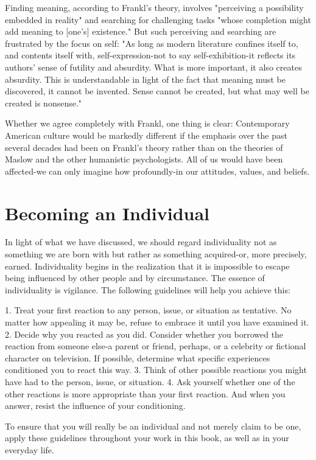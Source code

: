 \documentclass{book}
\begin{document}
Finding meaning, according to Frankl’s theory, involves "perceiving a possibility embedded in reality" and searching for challenging tasks "whose completion might add meaning to [one’s] existence." But such perceiving and searching are frustrated by the focus on self: "As long as modern literature confines itself to, and contents itself with, self-expression-not to say self-exhibition-it reflects its authors’ sense of futility and absurdity. What is more important, it also creates absurdity. This is understandable in light of the fact that meaning must be discovered, it cannot be invented. Sense cannot be created, but what may well be created is nonsense."

Whether we agree completely with Frankl, one thing is clear: Contemporary American culture would be markedly different if the emphasis over the past several decades had been on Frankl’s theory rather than on the theories of Maslow and the other humanistic psychologists. All of us would have been affected-we can only imagine how profoundly-in our attitudes, values, and beliefs.

\section{Becoming an Individual}

In light of what we have discussed, we should regard individuality not as something we are born with but rather as something acquired-or, more precisely, earned. Individuality begins in the realization that it is impossible to escape being influenced by other people and by circumstance. The essence of individuality is vigilance. The following guidelines will help you achieve this:

1. Treat your first reaction to any person, issue, or situation as tentative. No matter how appealing it may be, refuse to embrace it until you have examined it.
2. Decide why you reacted as you did. Consider whether you borrowed the reaction from someone else-a parent or friend, perhaps, or a celebrity or fictional character on television. If possible, determine what specific experiences conditioned you to react this way.
3. Think of other possible reactions you might have had to the person, issue, or situation.
4. Ask yourself whether one of the other reactions is more appropriate than your first reaction. And when you answer, resist the influence of your conditioning.

To ensure that you will really be an individual and not merely claim to be one, apply these guidelines throughout your work in this book, as well as in your everyday life.
\end{document}
